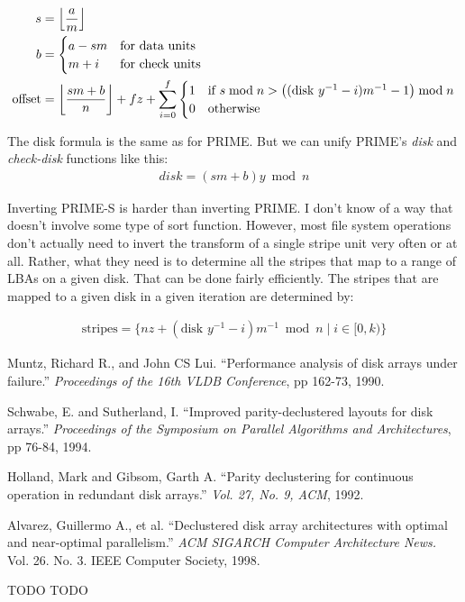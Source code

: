 \documentclass[onecolumn,draft]{IEEEtran}
\DeclarePairedDelimiter\floor{\lfloor}{\rfloor}
\begin{document}
\begin{align}
	s &= \floor*{\frac{a}{m}} \\
	b &= \begin{cases}
		a - s m & \text{for data units} \\
		m + i & \text{for check units}
	\end{cases} \\
	\text{offset} &= \floor*{\frac{s m + b}{n}} + f z +
	\displaystyle\sum_{i=0}^{f} \begin{cases}
		1 & \text{if } s \bmod n >
			\big((\text{disk } y^{-1} - i) m^{-1} - 1\big) \bmod n \\
		0 & \text{otherwise}
	\end{cases}
\end{align}

The disk formula is the same as for PRIME.  But we can unify PRIME's \emph{disk} and \emph{check-disk} functions like this:
\begin{align}
	disk = (s m + b) y \bmod n
\end{align}

Inverting PRIME-S is harder than inverting PRIME.  I don't know of a way that
doesn't involve some type of sort function.  However, most file system
operations don't actually need to invert the transform of a single stripe unit
very often or at all.  Rather, what they need is to determine all the stripes
that map to a range of LBAs on a given disk.  That can be done fairly
efficiently.  The stripes that are mapped to a given disk in a given iteration
are determined by:

\begin{align}
	\text{stripes} = \{ n z + (\text{disk } y^{-1} - i) m^{-1} \bmod n
	\mid i \in [0, k) \}
\end{align}

\begin{thebibliography}{99}

 Muntz, Richard R., and John CS Lui. ``Performance analysis
of disk arrays under failure.'' \emph{Proceedings of the 16th VLDB Conference},
pp 162-73, 1990.

 Schwabe, E. and Sutherland, I.  ``Improved
parity-declustered layouts for disk arrays.'' \emph{Proceedings of the
Symposium on Parallel Algorithms and Architectures}, pp 76-84, 1994.

 Holland, Mark and Gibsom, Garth A. ``Parity declustering for
continuous operation in redundant disk arrays.'' \emph{Vol. 27, No. 9, ACM},
1992.

 Alvarez, Guillermo A., et al. ``Declustered disk array
architectures with optimal and near-optimal parallelism.'' \emph{ACM SIGARCH
Computer Architecture News.} Vol. 26. No. 3. IEEE Computer Society, 1998.

 TODO
 TODO

\end{thebibliography}
\end{document}
